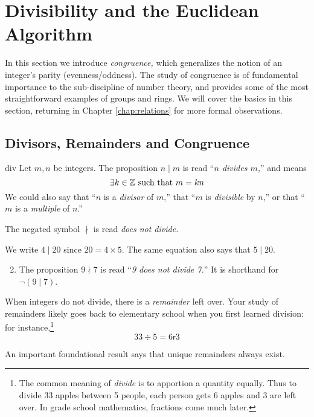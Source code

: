 \section{Divisibility and the Euclidean Algorithm}\label{chap:gcd}


In this section we introduce \emph{congruence,} which generalizes the notion of an integer's parity (evenness/oddness). The study of congruence is of fundamental importance to the sub-discipline of number theory, and provides some of the most straightforward examples of groups and rings. We will cover the basics in this section, returning in Chapter \ref{chap:relations} for more formal observations.


\subsection{Divisors, Remainders and Congruence}\label{sec:cong}


\begin{defn}{}{div}
	Let $m,n$ be integers. The proposition $n\mid m$ is read ``\emph{$n$ divides $m$,}'' and means
	\[
		\exists k\in\mathbb{Z}\text{ such that }m=kn
	\]
	We could also say that ``$n$ is a \emph{divisor} of $m$,'' that ``$m$ is \emph{divisible} by $n$,'' or that ``$m$ is a \emph{multiple} of $n$.''
\end{defn}

The negated symbol $\nmid$ is read \emph{does not divide.}

\begin{examples}{}{}
	\exstart We write $4\mid 20$ since $20=4\times 5$. The same equation also says that $5\mid 20$.
	\begin{enumerate}\setcounter{enumi}{1}
		\item The proposition $9\nmid 7$ is read ``\emph{9 does not divide 7.}'' It is shorthand for $\neg(9\mid 7)$.
	\end{enumerate}
\end{examples}

When integers do not divide, there is a \emph{remainder} left over. Your study of remainders likely goes back to elementary school when you first learned division: for instance,\footnote{The common meaning of \emph{divide} is to apportion a quantity equally. Thus to divide 33 apples between 5 people, each person gets 6 apples and 3 are left over. In grade school mathematics, fractions come much later.}
\[
	33\div 5=6\mathbin{\mathsf r}3 \tag{``6 remainder 3''}
\]

An important foundational result says that unique remainders always exist.


